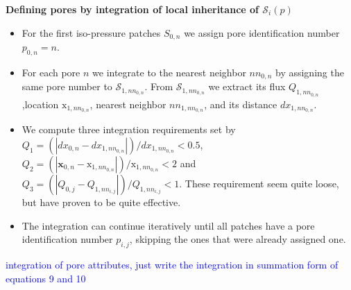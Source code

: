 \documentclass[draft,jgrga]{agutexSI2019}
\newcommand{\markblue}[1]{\textcolor{blue}{#1}}
\begin{document}
\begin{article}
\noindent\textbf{Defining pores by integration of local inheritance of $\mathcal{S}_i(p)$}
\begin{itemize}
	\item For the first iso-pressure patches $S_{0,n}$ we assign pore identification number $p_{0,n} = n$. 
	\item For each pore $n$ we integrate to the nearest neighbor $nn_{0,n}$ by assigning the same pore number to $\mathcal{S}_{1,nn_{0,n}}$. From $\mathcal{S}_{1,nn_{0,n}}$ we extract its flux $Q_{1,nn_{0,n}}$,location $\mathrm{x}_{1,nn_{0,n}}$, nearest neighbor $nn_{1,nn_{0,n}}$, and its distance $dx_{1,nn_{0,n}}$.
	\item We compute three integration requirements set by $Q_1 = (|dx_{0,n}-dx_{1,nn_{0,n}}|)/dx_{1,nn_{0,n}}<0.5$, $Q_2 = (|\mathbf{x}_{0,n}-\mathrm{x}_{1,nn_{0,n}}|)/\mathrm{x}_{1,nn_{0,n}}<2$ and $Q_3 = (|Q_{0,j}-Q_{1,nn_{i,j}}|)/Q_{1,nn_{i,j}}<1$. These requirement seem quite loose, but have proven to be quite effective. 
	\item The integration can continue iteratively until all patches have a pore identification number $p_{i,j}$, skipping the ones that were already assigned one. 
\end{itemize}

\markblue{integration of pore attributes, just write the integration in summation form of equations 9 and 10}



\end{article}
\end{document}
